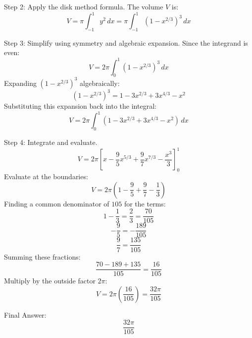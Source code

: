 \documentclass{article}
\begin{document}
Step 2: Apply the disk method formula.
The volume $V$ is:
\[
V = \pi \int_{-1}^{1} y^2 \, dx = \pi \int_{-1}^{1} (1 - x^{2/3})^3 \, dx
\]

Step 3: Simplify using symmetry and algebraic expansion.
Since the integrand is even:
\[
V = 2\pi \int_{0}^{1} (1 - x^{2/3})^3 \, dx
\]
Expanding $(1 - x^{2/3})^3$ algebraically:
\[
(1 - x^{2/3})^3 = 1 - 3x^{2/3} + 3x^{4/3} - x^2
\]
Substituting this expansion back into the integral:
\[
V = 2\pi \int_{0}^{1} (1 - 3x^{2/3} + 3x^{4/3} - x^2) \, dx
\]

Step 4: Integrate and evaluate.
\[
V = 2\pi \left[ x - \frac{9}{5} x^{5/3} + \frac{9}{7} x^{7/3} - \frac{x^3}{3} \right]_{0}^{1}
\]
Evaluate at the boundaries:
\[
V = 2\pi \left( 1 - \frac{9}{5} + \frac{9}{7} - \frac{1}{3} \right)
\]
Finding a common denominator of $105$ for the terms:
\[
1 - \frac{1}{3} = \frac{2}{3} = \frac{70}{105}
\]
\[
-\frac{9}{5} = -\frac{189}{105}
\]
\[
\frac{9}{7} = \frac{135}{105}
\]
Summing these fractions:
\[
\frac{70 - 189 + 135}{105} = \frac{16}{105}
\]
Multiply by the outside factor $2\pi$:
\[
V = 2\pi \left( \frac{16}{105} \right) = \frac{32\pi}{105}
\]

Final Answer:
\[
\boxed{\frac{32\pi}{105}}
\]
\end{document}
